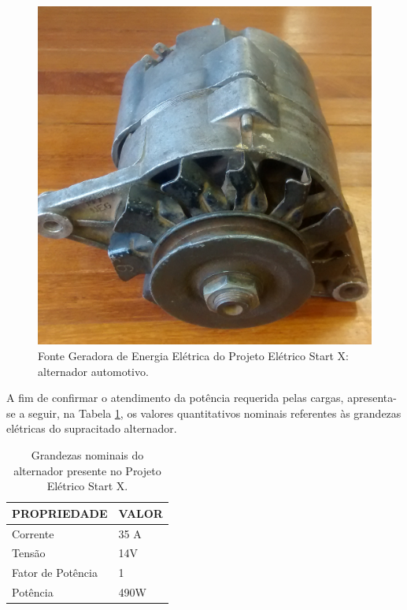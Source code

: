 \begin{figure}[h]
	\centering
	\includegraphics[scale=0.2]		{figuras/alternador.png}
	\caption{Fonte Geradora de Energia Elétrica do Projeto Elétrico Start X: alternador automotivo.}
	\label{alternador}
\end{figure}

A fim de confirmar o atendimento da potência requerida pelas cargas, apresenta-se a seguir, na Tabela \ref{grandezas-alternador}, os valores quantitativos nominais referentes às grandezas elétricas do supracitado alternador.

\begin{table}[h]
\centering
\begin{tabular}{|l|l|}
\hline
\rowcolor[HTML]{329A9D} 
PROPRIEDADE                                                           & VALOR                                                   \\ \hline
Corrente & 35 A 
\\ \hline
Tensão & 14V
\\ \hline
Fator de Potência\protect\footnotemark  & 1                                                      \\ \hline
Potência & 490W
\\ \hline
\end{tabular}
\caption{Grandezas nominais do alternador presente no Projeto Elétrico Start X.}
\label{grandezas-alternador}
\end{table}

